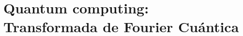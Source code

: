 \documentclass{article}
\begin{document}

\newpage
\section{Quantum computing: Transformada de Fourier Cuántica} \label{sec:quantum}
\end{document}

